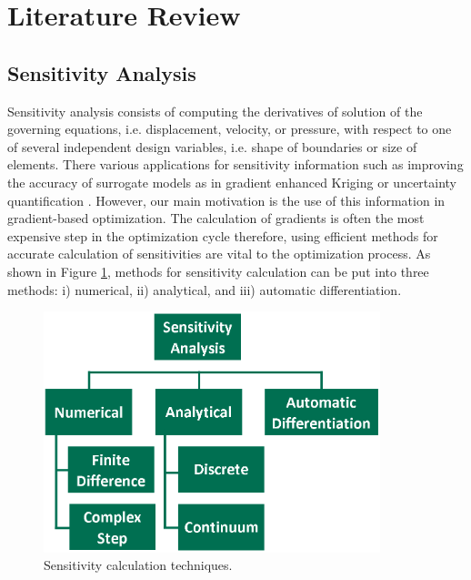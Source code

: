 \section{Literature Review}
\subsection{Sensitivity Analysis}
Sensitivity analysis consists of computing the derivatives of solution of the governing equations, i.e. displacement, velocity, or pressure, with respect to one of several independent design variables, i.e. shape of boundaries or size of elements. There various applications for sensitivity information such as improving the accuracy of surrogate models as in gradient enhanced Kriging \cite{han2013improving} or uncertainty quantification \cite{pettit2004uncertainty}. However, our main motivation is the use of this information in gradient-based optimization. The calculation of gradients is often the most expensive step in the optimization cycle therefore, using efficient methods for accurate calculation of sensitivities are vital to the optimization process. As shown in Figure \ref{fig:C1_sensitivityTaxonomy}, methods for sensitivity calculation can be put into three methods: i) numerical, ii) analytical, and iii) automatic differentiation.

\begin{figure}[h]
	\centering
	\includegraphics[height=7.00cm]{Chapter_1/figure/sensitivity_taxonomy.png}
	\caption{Sensitivity calculation techniques.}
	\label{fig:C1_sensitivityTaxonomy}
\end{figure}

